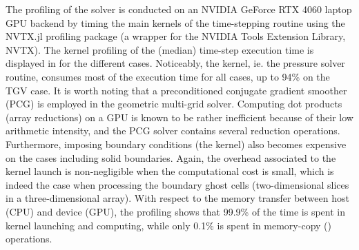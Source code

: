 \documentclass[10pt,a4paper]{article}
\begin{document}
The profiling of the solver is conducted on an NVIDIA GeForce RTX 4060 laptop GPU backend by timing the main kernels of the time-stepping routine using the NVTX.jl profiling package \citep{Byrne2023} (a wrapper for the NVIDIA Tools Extension Library, NVTX). The kernel profiling of the (median) time-step execution time is displayed in  for the different cases. Noticeably, the  kernel, ie. the pressure solver routine, consumes most of the execution time for all cases, up to 94\% on the TGV case. It is worth noting that a preconditioned conjugate gradient smoother (PCG) is employed in the geometric multi-grid solver. Computing dot products (array reductions) on a GPU is known to be rather inefficient because of their low arithmetic intensity, and the PCG solver contains several reduction operations. Furthermore, imposing boundary conditions (the  kernel) also becomes expensive on the cases including solid boundaries. Again, the overhead associated to the kernel launch is non-negligible when the computational cost is small, which is indeed the case when processing the boundary ghost cells (two-dimensional slices in a three-dimensional array). With respect to the memory transfer between host (CPU) and device (GPU), the profiling shows that 99.9\% of the time is spent in kernel launching and computing, while only 0.1\% is spent in memory-copy () operations.
\end{document}
